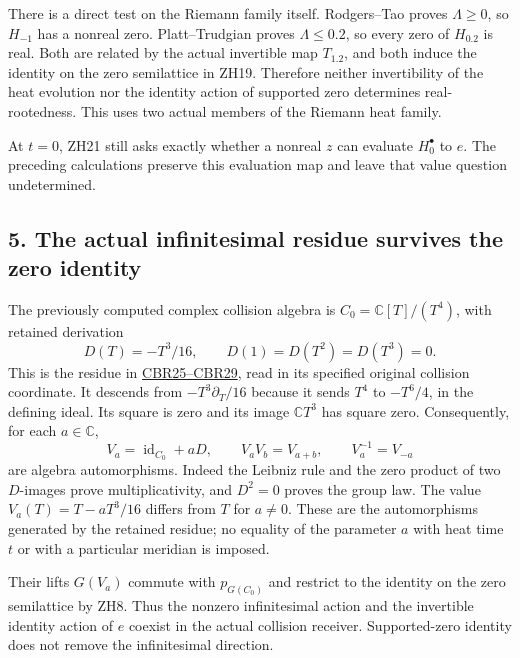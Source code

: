 \documentclass[
  10pt,
  a4paper,
]{article}
\begin{document}
There is a direct test on the Riemann family itself. Rodgers--Tao proves
\(\Lambda\ge0\), so \(H_{-1}\) has a nonreal zero. Platt--Trudgian
proves \(\Lambda\le0.2\), so every zero of \(H_{0.2}\) is real. Both are
related by the actual invertible map \(T_{1.2}\), and both induce the
identity on the zero semilattice in ZH19. Therefore neither
invertibility of the heat evolution nor the identity action of supported
zero determines real-rootedness. This uses two actual members of the
Riemann heat family.

At \(t=0\), ZH21 still asks exactly whether a nonreal \(z\) can evaluate
\(H_0^\bullet\) to \(e\). The preceding calculations preserve this
evaluation map and leave that value question undetermined.

\subsection{5. The actual infinitesimal residue survives the zero
identity}\label{the-actual-infinitesimal-residue-survives-the-zero-identity}

The previously computed complex collision algebra is
\(C_0=\mathbb C[T]/(T^4)\), with retained derivation \[
D(T)=-T^3/16,\qquad D(1)=D(T^2)=D(T^3)=0.
\tag{ZH22}
\] This is the residue in
\href{https://github.com/KokunoYumeto/zeta-function-research-reader/blob/4a4238afc992e77aee83b97d38a1a63d283f540c/workbenches/splitzero-tandem/branches/tau-zero-prime-positivity/CLASS_FIELD_SIGNED_HOLONOMY_DERIVATION.md}{CBR25--CBR29},
read in its specified original collision coordinate. It descends from
\(-T^3\partial_T/16\) because it sends \(T^4\) to \(-T^6/4\), in the
defining ideal. Its square is zero and its image \(\mathbb CT^3\) has
square zero. Consequently, for each \(a\in\mathbb C\), \[
V_a=\operatorname{id}_{C_0}+aD,\qquad V_aV_b=V_{a+b},\qquad V_a^{-1}=V_{-a}
\tag{ZH23}
\] are algebra automorphisms. Indeed the Leibniz rule and the zero
product of two \(D\)-images prove multiplicativity, and \(D^2=0\) proves
the group law. The value \(V_a(T)=T-aT^3/16\) differs from \(T\) for
\(a\ne0\). These are the automorphisms generated by the retained
residue; no equality of the parameter \(a\) with heat time \(t\) or with
a particular meridian is imposed.

Their lifts \(G(V_a)\) commute with \(p_{G(C_0)}\) and restrict to the
identity on the zero semilattice by ZH8. Thus the nonzero infinitesimal
action and the invertible identity action of \(e\) coexist in the actual
collision receiver. Supported-zero identity does not remove the
infinitesimal direction.
\end{document}
